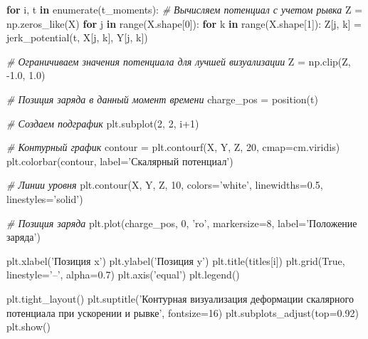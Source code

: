 \documentclass[11pt]{article}
\newenvironment{Shaded}{}{}
\newcommand{\KeywordTok}[1]{\textcolor[rgb]{0.00,0.44,0.13}{\textbf{{#1}}}}
\newcommand{\DecValTok}[1]{\textcolor[rgb]{0.25,0.63,0.44}{{#1}}}
\newcommand{\FloatTok}[1]{\textcolor[rgb]{0.25,0.63,0.44}{{#1}}}
\newcommand{\StringTok}[1]{\textcolor[rgb]{0.25,0.44,0.63}{{#1}}}
\newcommand{\CommentTok}[1]{\textcolor[rgb]{0.38,0.63,0.69}{\textit{{#1}}}}
\newcommand{\NormalTok}[1]{{#1}}
\newcommand{\VariableTok}[1]{\textcolor[rgb]{0.10,0.09,0.49}{{#1}}}
\newcommand{\ControlFlowTok}[1]{\textcolor[rgb]{0.00,0.44,0.13}{\textbf{{#1}}}}
\newcommand{\OperatorTok}[1]{\textcolor[rgb]{0.40,0.40,0.40}{{#1}}}
\newcommand{\BuiltInTok}[1]{{#1}}
\begin{document}
\begin{Shaded}
\begin{Highlighting}[]
\ControlFlowTok{for}\NormalTok{ i, t }\KeywordTok{in} \BuiltInTok{enumerate}\NormalTok{(t_moments):}
    \CommentTok{# Вычисляем потенциал с учетом рывка}
\NormalTok{    Z }\OperatorTok{=}\NormalTok{ np.zeros_like(X)}
    \ControlFlowTok{for}\NormalTok{ j }\KeywordTok{in} \BuiltInTok{range}\NormalTok{(X.shape[}\DecValTok{0}\NormalTok{]):}
        \ControlFlowTok{for}\NormalTok{ k }\KeywordTok{in} \BuiltInTok{range}\NormalTok{(X.shape[}\DecValTok{1}\NormalTok{]):}
\NormalTok{            Z[j, k] }\OperatorTok{=}\NormalTok{ jerk_potential(t, X[j, k], Y[j, k])}

    \CommentTok{# Ограничиваем значения потенциала для лучшей визуализации}
\NormalTok{    Z }\OperatorTok{=}\NormalTok{ np.clip(Z, }\FloatTok{-1.0}\NormalTok{, }\FloatTok{1.0}\NormalTok{)}

    \CommentTok{# Позиция заряда в данный момент времени}
\NormalTok{    charge_pos }\OperatorTok{=}\NormalTok{ position(t)}

    \CommentTok{# Создаем подграфик}
\NormalTok{    plt.subplot(}\DecValTok{2}\NormalTok{, }\DecValTok{2}\NormalTok{, i}\OperatorTok{+}\DecValTok{1}\NormalTok{)}

    \CommentTok{# Контурный график}
\NormalTok{    contour }\OperatorTok{=}\NormalTok{ plt.contourf(X, Y, Z, }\DecValTok{20}\NormalTok{, cmap}\OperatorTok{=}\NormalTok{cm.viridis)}
\NormalTok{    plt.colorbar(contour, label}\OperatorTok{=}\StringTok{'Скалярный потенциал'}\NormalTok{)}

    \CommentTok{# Линии уровня}
\NormalTok{    plt.contour(X, Y, Z, }\DecValTok{10}\NormalTok{, colors}\OperatorTok{=}\StringTok{'white'}\NormalTok{, linewidths}\OperatorTok{=}\FloatTok{0.5}\NormalTok{, linestyles}\OperatorTok{=}\StringTok{'solid'}\NormalTok{)}

    \CommentTok{# Позиция заряда}
\NormalTok{    plt.plot(charge_pos, }\DecValTok{0}\NormalTok{, }\StringTok{'ro'}\NormalTok{, markersize}\OperatorTok{=}\DecValTok{8}\NormalTok{, label}\OperatorTok{=}\StringTok{'Положение заряда'}\NormalTok{)}

\NormalTok{    plt.xlabel(}\StringTok{'Позиция x'}\NormalTok{)}
\NormalTok{    plt.ylabel(}\StringTok{'Позиция y'}\NormalTok{)}
\NormalTok{    plt.title(titles[i])}
\NormalTok{    plt.grid(}\VariableTok{True}\NormalTok{, linestyle}\OperatorTok{=}\StringTok{'--'}\NormalTok{, alpha}\OperatorTok{=}\FloatTok{0.7}\NormalTok{)}
\NormalTok{    plt.axis(}\StringTok{'equal'}\NormalTok{)}
\NormalTok{    plt.legend()}

\NormalTok{plt.tight_layout()}
\NormalTok{plt.suptitle(}\StringTok{'Контурная визуализация деформации скалярного потенциала при ускорении и рывке'}\NormalTok{, fontsize}\OperatorTok{=}\DecValTok{16}\NormalTok{)}
\NormalTok{plt.subplots_adjust(top}\OperatorTok{=}\FloatTok{0.92}\NormalTok{)}
\NormalTok{plt.show()}


\end{Highlighting}
\end{Shaded}
\end{document}
